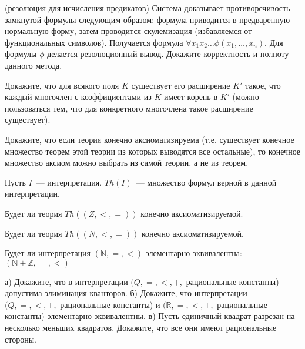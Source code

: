 \setcounter{curtask}{33}


\begin{task}(резолюция для исчисления предикатов)
    Система доказывает противоречивость замкнутой формулы следующим
    образом: формула приводится в предваренную нормальную форму, затем
    проводится скулемизация (избавляемся от функциональных
    символов). Получается формула $\forall x_1 x_2 \dots
    \phi(x_1, \dots, x_n)$. Для формулы $\phi$ делается резолюционный
    вывод. Докажите корректность и полноту данного метода.
\end{task}

\begin{task}
    Докажите, что для всякого поля $K$ существует его расширение $K'$
    такое, что каждый многочлен с коэффициентами из $K$ имеет корень
    в $K'$ (можно пользоваться тем, что для конкретного многочлена
    такое расширение существует).
\end{task}

\begin{task}
    Докажите, что если теория конечно аксиоматизируема
    (т.е. существует конечное множество теорем этой теории из которых выводятся все
    остальные), то конечное множество аксиом можно выбрать из самой
    теории, а не из теорем.
\end{task}

Пусть $I$~--- интерпретация. $Th(I)$~--- множество формул верной в
данной интерпретации.

\begin{task}
    Будет ли теория $Th((Z, <, =))$ конечно аксиоматизируемой.
\end{task}

\begin{task}
    Будет ли теория $Th((N, <, =))$ конечно аксиоматизируемой.
\end{task}


\breakline

\begin{ptask}{26}
    Будет ли интерпретация $(\mathbb{N}, =, <)$ элементарно
    эквивалентна: $(\mathbb{N} + \mathbb{Z}, =, <)$
\end{ptask}

\begin{ptask}{27}
    а) Докажите, что в интерпретации $(Q, =, <, +,$ рациональные
    константы) допустима элиминация кванторов.
    б) Докажите, что интерпретации $(Q, =, <, +,$ рациональные
    константы) и $(\mathbb{R}, =, <, +,$ рациональные константы)
    элементарно эквивалентны.
    в) Пусть единичный квадрат разрезан на несколько меньших
    квадратов. Докажите, что все они имеют рациональные стороны.
\end{ptask}
